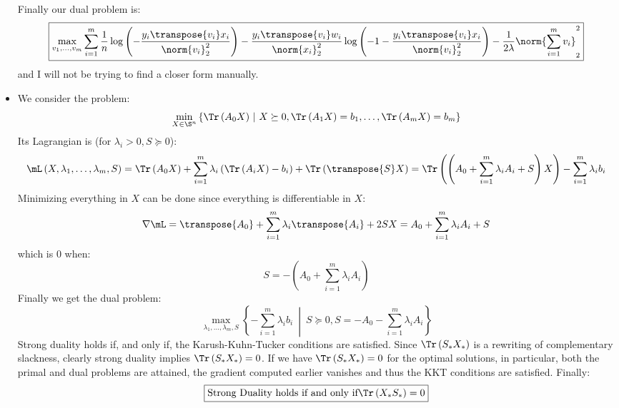 \documentclass[math, info]{cours}
\begin{document}
\begin{itemize}
\begin{equation*}
		\end{equation*}
		Finally our dual problem is:
		\begin{equation*}
			\boxed{\max_{v_{1}, \ldots, v_{m}}\sum_{i = 1}^{m}\frac{1}{n} \log\left( -\frac{y_{i}\transpose{v_{i}}x_{i}}{\norm{v_{i}}_{2}^{2}} \right)- \frac{y_{i}\transpose{v_{i}}w_{i}}{\norm{x_{i}}_{2}^{2}}\log\left( -1 - \frac{y_{i}\transpose{v_{i}}x_{i}}{\norm{v_{i}}_{2}^{2}} \right) - \frac{1}{2\lambda} \norm{\sum_{i = 1}^{m}v_{i}}_{2}^{2}}
		\end{equation*}
		and I will not be trying to find a closer form manually.
	\item We consider the problem:
		\begin{equation*}
			\min_{X\in \S^{n}} \left\{ \Tr\left( A_{0}X \right)\ \middle|\ X \succeq 0, \Tr\left( A_{1}X \right) = b_{1}, \ldots, \Tr\left( A_{m}X \right) = b_{m} \right\}
		\end{equation*}
		Its Lagrangian is (for $\lambda_{i} > 0, S \succeq 0$):
		\begin{equation*}
			\mL\left( X, \lambda_{1}, \ldots, \lambda_{m}, S\right) = \Tr\left( A_{0}X \right) + \sum_{i = 1}^{m}\lambda_{i}\left( \Tr\left( A_{i}X \right) - b_{i} \right) + \Tr\left( \transpose{S}X \right) = \Tr\left( \left( A_{0} + \sum_{i = 1}^{m} \lambda_{i}A_{i} + S \right)X \right) - \sum_{i = 1}^{m}\lambda_{i}b_{i}
		\end{equation*}
		Minimizing everything in $X$ can be done since everything is differentiable in $X$:
		\begin{equation*}
			\nabla \mL = \transpose{A_{0}} + \sum_{i = 1}^{m}\lambda_{i}\transpose{A_{i}} + 2 SX = A_{0} + \sum_{i = 1}^{m}\lambda_{i}A_{i} + S
		\end{equation*}
		which is $0$ when:
		\begin{equation*}
			S = -\left( A_{0} + \sum_{i = 1}^{m} \lambda_{i}A_{i}\right)
		\end{equation*}
		Finally we get the dual problem:
		\begin{equation*}
			\boxed{\max_{\lambda_{1},\ldots, \lambda_{m}, S} \left\{ -\sum_{i = 1}^{m}\lambda_{i}b_{i}\ \middle| \ S \succeq 0, S = -A_{0} - \sum_{i = 1}^{m}\lambda_{i}A_{i} \right\}}
		\end{equation*}
		Strong duality holds if, and only if, the Karush-Kuhn-Tucker conditions are satisfied.
		Since $\Tr\left( S_{*}X_{*} \right)$ is a rewriting of complementary slackness, clearly strong duality implies $\Tr\left(  S_{*}X_{*} \right) = 0$.
		If we have $\Tr\left( S_{*}X_{*} \right) = 0$ for the optimal solutions, in particular, both the primal and dual problems are attained, the gradient computed earlier vanishes and thus the KKT conditions are satisfied.
		Finally:
		\begin{equation*}
			\boxed{\text{Strong Duality holds if and only if} \Tr\left( X_{*}S_{*} \right) = 0}
		\end{equation*}
\end{itemize}
\end{document}
